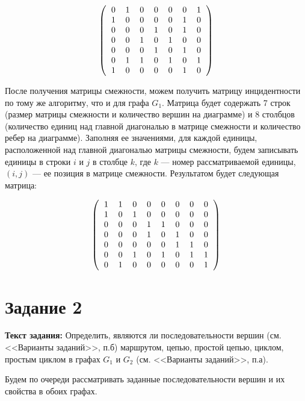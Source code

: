 \documentclass[12pt]{article}
\begin{document}
	$$
	\left(\begin{tabular}{c c c c c c c}
		0 & 1 & 0 & 0 & 0 & 0 & 1 \\
		1 & 0 & 0 & 0 & 0 & 1 & 0 \\
		0 & 0 & 0 & 1 & 0 & 1 & 0 \\
		0 & 0 & 1 & 0 & 1 & 0 & 0 \\
		0 & 0 & 0 & 1 & 0 & 1 & 0 \\
		0 & 1 & 1 & 0 & 1 & 0 & 1 \\
		1 & 0 & 0 & 0 & 0 & 1 & 0 \\
	\end{tabular}
	\right)
	$$
	
	После получения матрицы смежности, можем получить матрицу инцидентности по тому же алгоритму, что и для графа $G_1$. Матрица будет содержать 7 строк (размер матрицы смежности и количество вершин на диаграмме) и 8 столбцов (количество единиц над главной диагональю в матрице смежности и количество ребер на диаграмме). Заполняя ее значениями, для каждой единицы, расположенной над главной диагональю матрицы смежности, будем записывать единицы в строки $i$ и $j$ в столбце $k$, где $k$ --- номер рассматриваемой единицы, $(i, j)$ --- ее позиция в матрице смежности. Результатом будет следующая матрица:
	
	$$
	\left(\begin{tabular} {c c c c c c c c}
		1 & 1 & 0 & 0 & 0 & 0 & 0 & 0 \\
		1 & 0 & 1 & 0 & 0 & 0 & 0 & 0 \\
		0 & 0 & 0 & 1 & 1 & 0 & 0 & 0 \\
		0 & 0 & 0 & 1 & 0 & 1 & 0 & 0 \\
		0 & 0 & 0 & 0 & 0 & 1 & 1 & 0 \\
		0 & 0 & 1 & 0 & 1 & 0 & 1 & 1 \\
		0 & 1 & 0 & 0 & 0 & 0 & 0 & 1 \\
	\end{tabular}
	\right)
	$$	
	
	\section{Задание 2}
	\label{task2}
	
	{\bf Текст задания:} Определить, являются ли последовательности вершин (см. <<Варианты заданий>>, п.б) маршрутом, цепью, простой цепью, циклом, простым циклом в графах $G_1$ и $G_2$ (см. <<Варианты заданий>>, п.а). 
	
	Будем по очереди рассматривать заданные последовательности вершин и их свойства в обоих графах.
	
\end{document}
